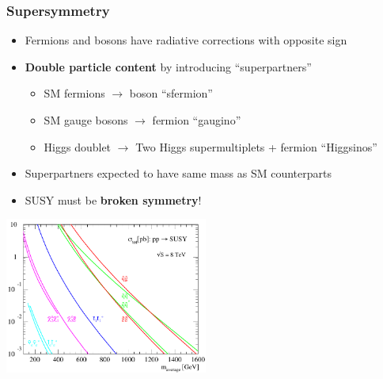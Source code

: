 \documentclass[10pt, svgnames]{beamer}
\begin{document}
\begin{frame}
  \frametitle{Supersymmetry}
  \begin{itemize}
    \item Fermions and bosons have radiative corrections with opposite sign
    \item \textbf{\color{nice_blue} Double particle content} by introducing
      ``superpartners''
      \begin{itemize}
        \item SM fermions $\rightarrow$ boson ``sfermion''
        \item SM gauge bosons $\rightarrow$ fermion ``gaugino''
        \item Higgs doublet $\rightarrow$ Two Higgs supermultiplets +
          fermion ``Higgsinos''
      \end{itemize}
    \item Superpartners expected to have same mass as SM counterparts
    \item SUSY must be \textbf{\color{nice_blue} broken symmetry}!
  \end{itemize}
  \begin{center}
    \includegraphics[width=0.5\textwidth]{figures/theory/prospino_lhc8.pdf}
  \end{center}
\end{frame}
\end{document}
